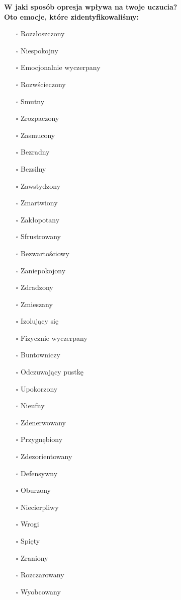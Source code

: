 \noindent\textcolor{ProcessBlue}{\textbf{\Large{W jaki sposób opresja wpływa na twoje uczucia?}}}\\
\large{\textbf{Oto emocje, które zidentyfikowaliśmy:}}
\begin{multicols}{3}
\begin{itemize}
\item[$\square$]{Rozzłoszczony}
\item[$\square$]{Niespokojny}
\item[$\square$]{Emocjonalnie wyczerpany}
\item[$\square$]{Rozwścieczony}
\item[$\square$]{Smutny}
\item[$\square$]{Zrozpaczony}
\item[$\square$]{Zasmucony}
\item[$\square$]{Bezradny}
\item[$\square$]{Bezsilny}
\item[$\square$]{Zawstydzony}
\item[$\square$]{Zmartwiony}
\item[$\square$]{Zakłopotany}
\item[$\square$]{Sfrustrowany}
\item[$\square$]{Bezwartościowy}
\item[$\square$]{Zaniepokojony}
\item[$\square$]{Zdradzony}
\item[$\square$]{Zmieszany}
\item[$\square$]{Izolujący się}
\item[$\square$]{Fizycznie wyczerpany}
\item[$\square$]{Buntowniczy}
\item[$\square$]{Odczuwający pustkę}
\item[$\square$]{Upokorzony}
\item[$\square$]{Nieufny}
\item[$\square$]{Zdenerwowany}
\item[$\square$]{Przygnębiony}
\item[$\square$]{Zdezorientowany}
\item[$\square$]{Defensywny}
\item[$\square$]{Oburzony}
\item[$\square$]{Niecierpliwy}
\item[$\square$]{Wrogi}
\item[$\square$]{Spięty}
\item[$\square$]{Zraniony}
\item[$\square$]{Rozczarowany}
\item[$\square$]{Wyobcowany}
\end{itemize}
\end{multicols}



